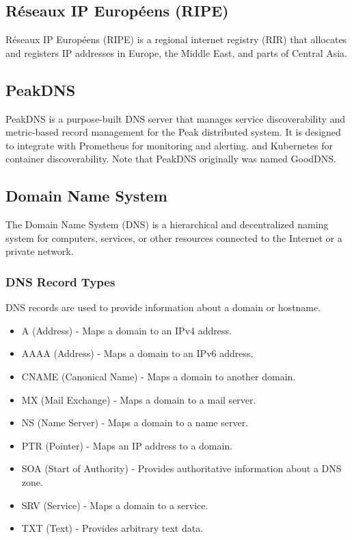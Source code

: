 \documentclass[12pt]{article}
\begin{document}
\subsection{Réseaux IP Européens (RIPE)}
Réseaux IP Européens (RIPE)\cite{WelcomeRIPERIPE2024} is a regional internet registry (RIR) 
that allocates and registers IP addresses in Europe, the Middle East, and parts of Central Asia.

\subsection{PeakDNS}
PeakDNS\cite{heimonenPeakDNS2024} is a purpose-built DNS server that manages service discoverability and 
metric-based record management for the Peak distributed system.
It is designed to integrate with Prometheus for monitoring and alerting.
and Kubernetes for container discoverability.
Note that PeakDNS originally was named GoodDNS.

\subsection{Domain Name System}
The Domain Name System (DNS)\cite{DomainNamesImplementation1987} is a hierarchical and decentralized naming system for computers, 
services, or other resources connected to the Internet or a private network.
\subsubsection{DNS Record Types}
DNS records are used to provide information about a domain or hostname.
\begin{itemize}
    \item A (Address) - Maps a domain to an IPv4 address.
    \item AAAA (Address) - Maps a domain to an IPv6 address.
    \item CNAME (Canonical Name) - Maps a domain to another domain.
    \item MX (Mail Exchange) - Maps a domain to a mail server.
    \item NS (Name Server) - Maps a domain to a name server.
    \item PTR (Pointer) - Maps an IP address to a domain.
    \item SOA (Start of Authority) - Provides authoritative information about a DNS zone.
    \item SRV (Service) - Maps a domain to a service.
    \item TXT (Text) - Provides arbitrary text data.
\end{itemize}
\end{document}
